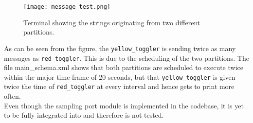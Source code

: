 \begin{figure}[H]
	\centering
	\texttt{[image: message\_test.png]}
	\caption{Terminal showing the strings originating from two different
		partitions.}
	\label{fig:message_test}
\end{figure}

As can be seen from the figure, the \texttt{yellow\_toggler} is sending twice as
many messages as \texttt{red\_toggler}. This is due to the scheduling of the two
partitions. The file main\_schema.xml shows that both partitions are
scheduled to execute twice within the major time-frame of 20 seconds, but that
\texttt{yellow\_toggler} is given twice the time of \texttt{red\_toggler} at
every interval and hence gets to print more often.\\

Even though the sampling port module is implemented in the codebase, it is yet
to be fully integrated into \OSname{} and therefore is not tested.
